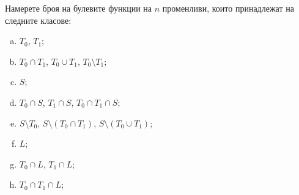 \begin{problem}
  Намерете броя на булевите функции на $n$ променливи, които принадлежат на следните класове:
  \begin{enumerate}[a)]
  \item
    $T_0$, $T_1$;
  \item
    $T_0 \cap T_1$, $T_0 \cup T_1$, $T_0 \setminus T_1$;
  \item
    $S$;
  \item
    $T_0 \cap S$, $T_1 \cap S$, $T_0 \cap T_1 \cap S$;
  \item
    $S \setminus T_0$, $S \setminus (T_0 \cap T_1)$, $S \setminus (T_0 \cup T_1)$;
  \item
    $L$;
  \item
    $T_0 \cap L$, $T_1 \cap L$;
  \item
    $T_0 \cap T_1 \cap L$;
  \end{enumerate}
\end{problem}



